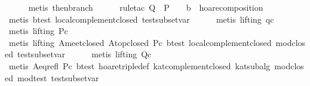 \begin{isabellebody}
\ \ \ \ \isamarkupfalse%
\ {}metis\ then{}branch{}\isanewline
\ \ \ \ \isamarkupfalse%
\ {}rule{}tac\ Q\ {}\ {}P\ {}\ {}\ {}\ {}b{}\ \ hoare{}composition{}\isanewline
\ \ \ \ \isamarkupfalse%
\ {}metis\ b{}test\ local{}complement{}closed\ test{}subset{}var{}\isanewline
\ \ \ \ \isamarkupfalse%
\ {}metis\ {}lifting{}\ qc{}\isanewline
\ \ \ \ \isamarkupfalse%
\ {}metis\ {}lifting{}\ Pc{}\isanewline
\ \ \ \ \isamarkupfalse%
\ {}metis\ {}lifting{}\ A{}meet{}closed\ A{}top{}closed\ Pc\ b{}test\ local{}complement{}closed\ mod{}closed\ test{}subset{}var{}\isanewline
\ \ \ \ \isamarkupfalse%
\ {}metis\ {}lifting{}\ Qc{}\isanewline
\ \ \ \ \isamarkupfalse%
\ {}metis\ A{}eq{}refl\ Pc\ b{}test\ hoare{}triple{}def\ kat{}complement{}closed\ kat{}subalg\ mod{}closed\ mod{}test\ test{}subset{}var{}\isanewline

\end{isabellebody}
